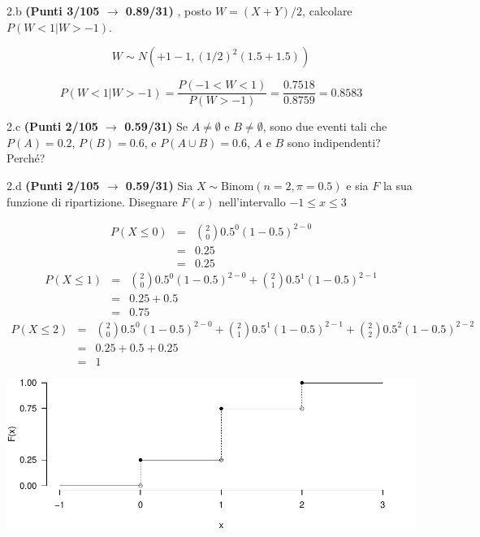 \documentclass[
  11pt,
]{book}
\theoremstyle{mytheoremstyle}
\theoremstyle{mydefstyle}
\newenvironment{sol}
  {
  \begin{tcolorbox}[enhanced,breakable,arc=0.1mm,boxrule=1pt,colback=white,colframe=iblue,
  title=\bf \fontfamily{lmss}\selectfont \hspace{.5 cm} Soluzione,drop fuzzy shadow]

}{
\end{tcolorbox}
  }
\begin{document}
2.b \textbf{(Punti 3/105 \(\rightarrow\) 0.89/31)} , posto \(W=(X+Y)/2\), calcolare \(P(W<1|W>-1)\).

\begin{sol}
\[
W\sim N(+1-1,(1/2)^2(1.5+1.5))
\]

\[ 
P(W<1|W>-1)=\frac{P(-1<W<1)}{P(W>-1)}=\frac{0.7518}{0.8759}=0.8583
\]

\end{sol}

2.c \textbf{(Punti 2/105 \(\rightarrow\) 0.59/31)} Se \(A\neq\emptyset\) e \(B\neq\emptyset\), sono due eventi tali che \(P(A)=0.2\), \(P(B)=0.6\), e \(P(A\cup B)=0.6\), \(A\) e \(B\) sono indipendenti? Perché?

2.d \textbf{(Punti 2/105 \(\rightarrow\) 0.59/31)} Sia \(X\sim\text{Binom}(n=2,\pi=0.5)\) e sia \(F\) la sua funzione di ripartizione. Disegnare \(F(x)\) nell'intervallo \(-1\leq x\leq 3\)

\begin{sol}

\normalsize 
\begin{eqnarray*}
      P( X \leq 0 ) &=& \binom{ 2 }{ 0 } 0.5 ^{ 0 }(1- 0.5 )^{ 2 - 0 } \\                 &=& 0.25 \\                 &=& 0.25 
   \end{eqnarray*}
\normalsize  \normalsize 
\begin{eqnarray*}
      P( X \leq 1 ) &=& \binom{ 2 }{ 0 } 0.5 ^{ 0 }(1- 0.5 )^{ 2 - 0 }+\binom{ 2 }{ 1 } 0.5 ^{ 1 }(1- 0.5 )^{ 2 - 1 } \\                 &=& 0.25+0.5 \\                 &=& 0.75 
   \end{eqnarray*}
\normalsize  \normalsize 
\begin{eqnarray*}
      P( X \leq 2 ) &=& \binom{ 2 }{ 0 } 0.5 ^{ 0 }(1- 0.5 )^{ 2 - 0 }+\binom{ 2 }{ 1 } 0.5 ^{ 1 }(1- 0.5 )^{ 2 - 1 }+\binom{ 2 }{ 2 } 0.5 ^{ 2 }(1- 0.5 )^{ 2 - 2 } \\                 &=& 0.25+0.5+0.25 \\                 &=& 1 
   \end{eqnarray*}
\normalsize 

\begin{center}\includegraphics{Esami_passati_con_soluzioni_files/figure-latex/2024-126-1} \end{center}

\end{sol}
\end{document}
